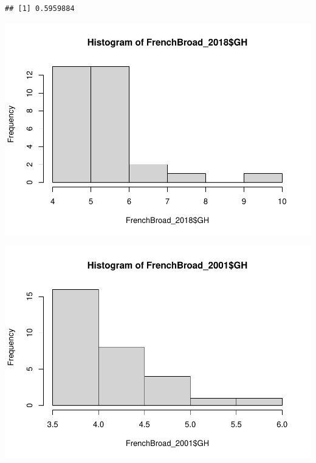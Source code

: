\documentclass[
  12pt,
]{article}
\newenvironment{Shaded}{\begin{snugshade}}{\end{snugshade}}
\newcommand{\FunctionTok}[1]{\textcolor[rgb]{0.00,0.00,0.00}{#1}}
\newcommand{\NormalTok}[1]{#1}
\newcommand{\SpecialCharTok}[1]{\textcolor[rgb]{0.00,0.00,0.00}{#1}}
\begin{document}
\begin{verbatim}
## [1] 0.5959884
\end{verbatim}

\begin{Shaded}
\end{Shaded}

\includegraphics{Project_Template_files/figure-latex/T-Test-4.pdf}

\begin{Shaded}
\end{Shaded}

\includegraphics{Project_Template_files/figure-latex/T-Test-5.pdf}
\end{document}
